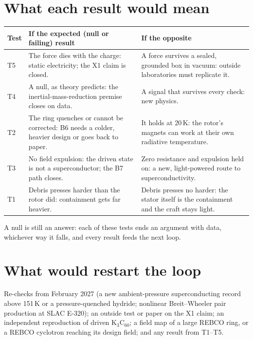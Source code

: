 \documentclass[10.5pt,a4paper]{article}
\newcommand{\Kc}{K$_3$C$_{60}$}
\begin{document}
\section{What each result would mean}
\begin{center}\small
\begin{tabularx}{\textwidth}{@{}l X X@{}}
\toprule
\textbf{Test} & \textbf{If the expected (null or failing) result} & \textbf{If the opposite}\\
\midrule
T5 & The force dies with the charge: static electricity; the X1 claim is closed. & A force survives a sealed, grounded box in vacuum: outside laboratories must replicate it.\\
T4 & A null, as theory predicts: the inertial-mass-reduction premise closes on data. & A signal that survives every check: new physics.\\
T2 & The ring quenches or cannot be corrected: B6 needs a colder, heavier design or goes back to paper. & It holds at 20\,K: the rotor's magnets can work at their own radiative temperature.\\
T3 & No field expulsion: the driven state is not a superconductor; the B7 path closes. & Zero resistance and expulsion held on: a new, light-powered route to superconductivity.\\
T1 & Debris presses harder than the rotor did: containment gets far heavier. & Debris presses no harder: the stator itself is the containment and the craft stays light.\\
\bottomrule
\end{tabularx}
\end{center}
A null is still an answer: each of these tests ends an argument with data, whichever way it falls, and every result feeds the next loop.

\section{What would restart the loop}
Re-checks from February 2027 (a new ambient-pressure superconducting record above 151\,K or a pressure-quenched hydride; nonlinear Breit--Wheeler pair production at SLAC E-320); an outside test or paper on the X1 claim; an independent reproduction of driven \Kc; a field map of a large REBCO ring, or a REBCO cyclotron reaching its design field; and any result from T1--T5.
\end{document}
